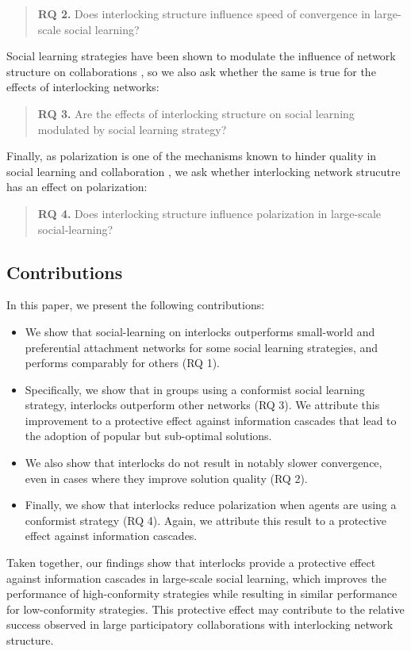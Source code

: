 \documentclass[manuscript,screen,review,acmsmall]{acmart}
\begin{document}
\begin{quote}
{\bfseries RQ 2.} Does interlocking structure influence speed of convergence in large-scale social learning?
\end{quote}

Social learning strategies have been shown to modulate the influence of network structure on collaborations
\cite{barkoczi_social_2016, zollman_social_2012},
so we also ask whether the same is true for the effects of interlocking networks:

\begin{quote}
{\bfseries RQ 3.} Are the effects of interlocking structure on social learning modulated by social learning strategy?
\end{quote}

Finally, as polarization is one of the mechanisms known to hinder quality in social learning and collaboration
\cite{schkade_what_2007, zollman_social_2012},
we ask whether interlocking network strucutre has an effect on polarization:

\begin{quote}
{\bfseries RQ 4.} Does interlocking structure influence polarization in large-scale social-learning?
\end{quote}

\subsection{Contributions}
In this paper, we present the following contributions:
\begin{itemize}
\item{We show that social-learning on interlocks outperforms small-world and preferential attachment networks for some social learning strategies, and performs comparably for others (RQ 1).}
\item{Specifically, we show that in groups using a conformist social learning strategy, interlocks outperform other networks (RQ 3).
We attribute this improvement to a protective effect against information cascades that lead to the adoption of popular but sub-optimal solutions.}
\item{We also show that interlocks do not result in notably slower convergence, even in cases where they improve solution quality (RQ 2).}
\item{Finally, we show that interlocks reduce polarization when agents are using a conformist strategy (RQ 4).
Again, we attribute this result to a protective effect against information cascades.}
\end{itemize}
Taken together, our findings show that interlocks provide a protective effect against information cascades in large-scale social learning, which improves the performance of high-conformity strategies while resulting in similar performance for low-conformity strategies.
This protective effect may contribute to the relative success observed in large participatory collaborations with interlocking network structure.
\end{document}
